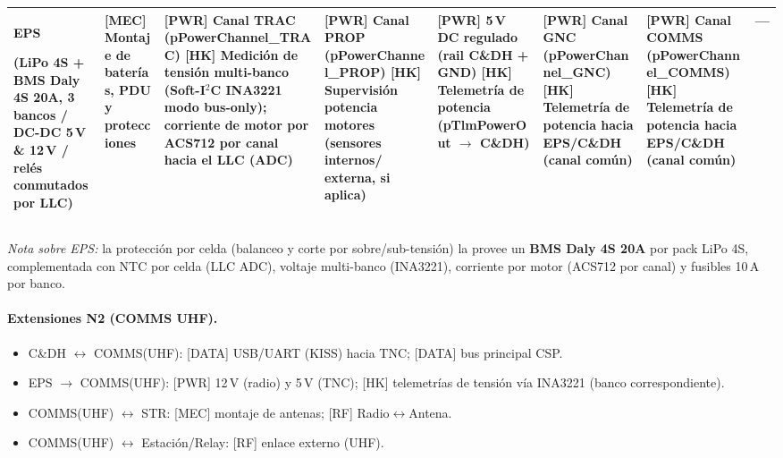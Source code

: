 \begin{landscape}
\begin{longtable}{|p{2.3cm}||p{2.9cm}|p{2.9cm}|p{2.9cm}|p{2.9cm}|p{2.9cm}|p{2.9cm}|p{2.9cm}|}
\textbf{EPS}\par(LiPo 4S + BMS Daly 4S 20A, 3 bancos / DC-DC 5\,V \& 12\,V / relés conmutados por LLC) & \textbf{[MEC]} Montaje de baterías, PDU y protecciones & \textbf{[PWR]} Canal TRAC (pPowerChannel\_TRAC) \newline \textbf{[HK]} Medición de tensión multi-banco (Soft-I$^2$C INA3221 modo bus-only); corriente de motor por ACS712 por canal hacia el LLC (ADC) & \textbf{[PWR]} Canal PROP (pPowerChannel\_PROP) \newline \textbf{[HK]} Supervisión potencia motores (sensores internos/ externa, si aplica) & \textbf{[PWR]} 5\,V DC regulado (rail C\&DH + GND) \newline \textbf{[HK]} Telemetría de potencia (pTlmPowerOut $\rightarrow$ C\&DH) & \textbf{[PWR]} Canal GNC (pPowerChannel\_GNC) \newline \textbf{[HK]} Telemetría de potencia hacia EPS/C\&DH (canal común) & \textbf{[PWR]} Canal COMMS (pPowerChannel\_COMMS) \newline \textbf{[HK]} Telemetría de potencia hacia EPS/C\&DH (canal común) & --- \\ \hline

\end{longtable}
\end{landscape}

\emph{Nota sobre EPS:} la protección por celda (balanceo y corte por sobre/sub-tensión) la provee un \textbf{BMS Daly 4S 20A} por pack LiPo 4S, complementada con NTC por celda (LLC ADC), voltaje multi-banco (INA3221), corriente por motor (ACS712 por canal) y fusibles 10\,A por banco.

\paragraph{Extensiones N2 (COMMS UHF).}
\begin{itemize}
  \item C\&DH $\leftrightarrow$ COMMS(UHF): [DATA] USB/UART (KISS) hacia TNC; [DATA] bus principal CSP.
  \item EPS $\rightarrow$ COMMS(UHF): [PWR] 12\,V (radio) y 5\,V (TNC); [HK] telemetrías de tensión vía INA3221 (banco correspondiente).
  \item COMMS(UHF) $\leftrightarrow$ STR: [MEC] montaje de antenas; [RF] Radio$\leftrightarrow$Antena.
  \item COMMS(UHF) $\leftrightarrow$ Estación/Relay: [RF] enlace externo (UHF).
\end{itemize}


